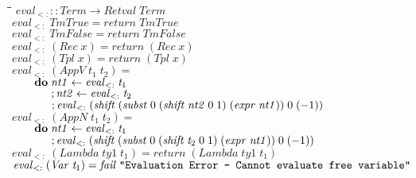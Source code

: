 \documentclass[10pt]{article}
\newlength{\lwidth}\setlength{\lwidth}{4.5cm}
\newlength{\cwidth}\setlength{\cwidth}{8mm} %
\newcommand{\Conid}[1]{\mathit{#1}}
\newcommand{\Varid}[1]{\mathit{#1}}
\begin{document}
\begin{tabbing}
\qquad\=\hspace{\lwidth}\=\hspace{\cwidth}\=\+\kill
${\Varid{eval}_{<:}\mathbin{::}\Conid{Term}\to \Conid{Retval}\;\Conid{Term}}$\\
${}$\\
${\Varid{eval}_{<:}\;\Conid{TmTrue}\mathrel{=}\Varid{return}\;\Conid{TmTrue}}$\\
${\Varid{eval}_{<:}\;\Conid{TmFalse}\mathrel{=}\Varid{return}\;\Conid{TmFalse}}$\\
${\Varid{eval}_{<:}\;(\Conid{Rec}\;\Varid{x})\mathrel{=}\Varid{return}\;(\Conid{Rec}\;\Varid{x})}$\\
${\Varid{eval}_{<:}\;(\Conid{Tpl}\;\Varid{x})\mathrel{=}\Varid{return}\;(\Conid{Tpl}\;\Varid{x})}$\\
${}$\\
${\Varid{eval}_{<:}\;(\Conid{AppV}\;\Varid{t}_1\;\Varid{t}_2)\mathrel{=}}$\\
${\hskip2.00em\relax\mathbf{do}\;\Varid{nt1}\leftarrow \Varid{eval}_{<:}\;\Varid{t}_1}$\\
${\hskip2.00em\relax\phantom{\mathbf{do}\;\mbox{}};\Varid{nt2}\leftarrow \Varid{eval}_{<:}\;\Varid{t}_2}$\\
${\hskip2.00em\relax\phantom{\mathbf{do}\;\mbox{}};\Varid{eval}_{<:}\;(\Varid{shift}\;(\Varid{subst}\;\mathrm{0}\;(\Varid{shift}\;\Varid{nt2}\;\mathrm{0}\;\mathrm{1})\;(\Varid{expr}\;\Varid{nt1}))\;\mathrm{0}\;(\mathbin{-}\mathrm{1}))}$\\
${}$\\
${\Varid{eval}_{<:}\;(\Conid{AppN}\;\Varid{t}_1\;\Varid{t}_2)\mathrel{=}}$\\
${\hskip2.00em\relax\mathbf{do}\;\Varid{nt1}\leftarrow \Varid{eval}_{<:}\;\Varid{t}_1}$\\
${\hskip2.00em\relax\phantom{\mathbf{do}\;\mbox{}};\Varid{eval}_{<:}\;(\Varid{shift}\;(\Varid{subst}\;\mathrm{0}\;(\Varid{shift}\;\Varid{t}_2\;\mathrm{0}\;\mathrm{1})\;(\Varid{expr}\;\Varid{nt1}))\;\mathrm{0}\;(\mathbin{-}\mathrm{1}))}$\\
${}$\\
${\Varid{eval}_{<:}\;(\Conid{Lambda}\;\Varid{ty1}\;\Varid{t}_1)\mathrel{=}\Varid{return}\;(\Conid{Lambda}\;\Varid{ty1}\;\Varid{t}_1)}$\\
${}$\\
${\Varid{eval}_{<:}\;(\Conid{Var}\;\Varid{t}_1)\mathrel{=}\Varid{fail}\;\text{\tt \char34 Evaluation~Error~-~Cannot~evaluate~free~variable\char34}}$\\

\end{tabbing}
\end{document}

